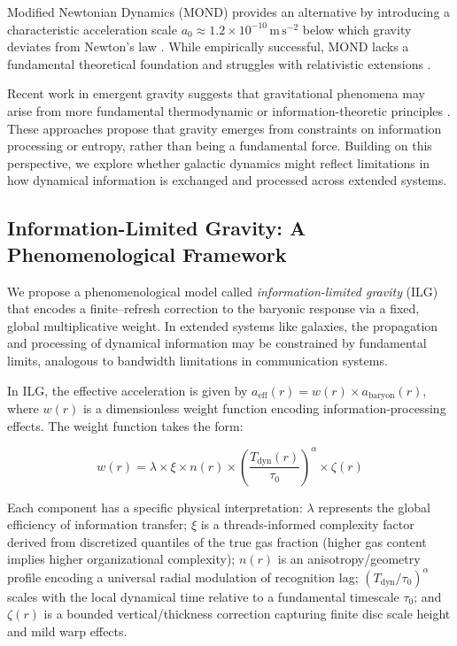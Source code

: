 \documentclass[usenatbib]{mnras}
\begin{document}
Modified Newtonian Dynamics (MOND) provides an alternative by introducing a characteristic acceleration scale $a_0 \approx 1.2 \times 10^{-10}\,\mathrm{m\,s^{-2}}$ below which gravity deviates from Newton's law \citep{milgrom1983}. While empirically successful, MOND lacks a fundamental theoretical foundation and struggles with relativistic extensions \citep{famaey2012}.

Recent work in emergent gravity suggests that gravitational phenomena may arise from more fundamental thermodynamic or information-theoretic principles \citep{verlinde2011, verlinde2017}. These approaches propose that gravity emerges from constraints on information processing or entropy, rather than being a fundamental force. Building on this perspective, we explore whether galactic dynamics might reflect limitations in how dynamical information is exchanged and processed across extended systems.

\subsection{Information-Limited Gravity: A Phenomenological Framework}

We propose a phenomenological model called \emph{information-limited gravity} (ILG) that encodes a finite–refresh correction to the baryonic response via a fixed, global multiplicative weight. In extended systems like galaxies, the propagation and processing of dynamical information may be constrained by fundamental limits, analogous to bandwidth limitations in communication systems.

In ILG, the effective acceleration is given by $a_\mathrm{eff}(r) = w(r) \times a_\mathrm{baryon}(r)$, where $w(r)$ is a dimensionless weight function encoding information-processing effects. The weight function takes the form:

\begin{equation}
w(r) = \lambda \times \xi \times n(r) \times \left(\frac{T_\mathrm{dyn}(r)}{\tau_0}\right)^\alpha \times \zeta(r)
\end{equation}

Each component has a specific physical interpretation: $\lambda$ represents the global efficiency of information transfer; $\xi$ is a threads-informed complexity factor derived from discretized quantiles of the true gas fraction (higher gas content implies higher organizational complexity); $n(r)$ is an anisotropy/geometry profile encoding a universal radial modulation of recognition lag; $(T_\mathrm{dyn}/\tau_0)^\alpha$ scales with the local dynamical time relative to a fundamental timescale $\tau_0$; and $\zeta(r)$ is a bounded vertical/thickness correction capturing finite disc scale height and mild warp effects.
\end{document}
